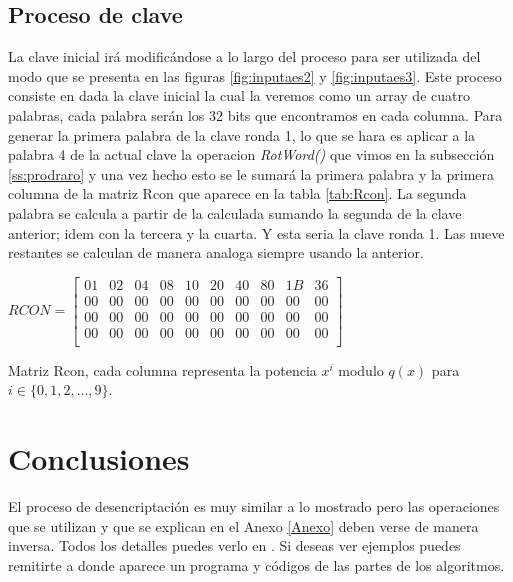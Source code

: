 \subsection{Proceso de clave}
La clave inicial irá modificándose a lo largo del proceso para ser utilizada del modo que se presenta en las figuras \ref{fig:inputaes2} y \ref{fig:inputaes3}. Este proceso consiste en dada la clave inicial la cual la veremos como un array de cuatro palabras, cada palabra serán los 32 bits que encontramos en cada columna. Para generar la primera palabra de la clave ronda 1, lo que se hara es aplicar a la palabra 4 de la actual clave la operacion {\sl RotWord()} que vimos en la subsección \ref{ss:prodraro} y una vez hecho esto se le sumará la primera palabra y la primera columna de la matriz Rcon que aparece en la tabla \ref{tab:Rcon}. La segunda palabra se calcula a partir de la calculada sumando la segunda de la clave anterior; idem con la tercera y la cuarta. Y esta seria la clave ronda 1. Las nueve restantes se calculan de manera analoga siempre usando la anterior.

\begin{table}[ht!]
\begin{center}
$RCON=$\tiny{$\left[
\begin{array}{cccccccccc}
 01 & 02 & 04 & 08 & 10 & 20 & 40 & 80 & 1B & 36\\
 00 & 00 & 00 & 00 & 00 & 00 & 00 & 00 & 00 & 00\\
 00 & 00 & 00 & 00 & 00 & 00 & 00 & 00 & 00 & 00\\
 00 & 00 & 00 & 00 & 00 & 00 & 00 & 00 & 00 & 00\\
\end{array}\right]$}
\end{center}\caption{Matriz Rcon, cada columna representa la potencia $x^i$ modulo $q(x)$ para $i\in\{0,1,2,\dots, 9\}$.}\label{tab:Rcon}
\end{table}


\section{Conclusiones}

El proceso de desencriptación es muy similar a lo mostrado pero las operaciones que se utilizan y que se explican en el Anexo \ref{Anexo} deben verse de manera inversa. Todos los detalles puedes verlo en \cite{Federal}. Si deseas ver ejemplos puedes remitirte a \cite{Java} donde aparece un programa y códigos de las partes de los algoritmos.

